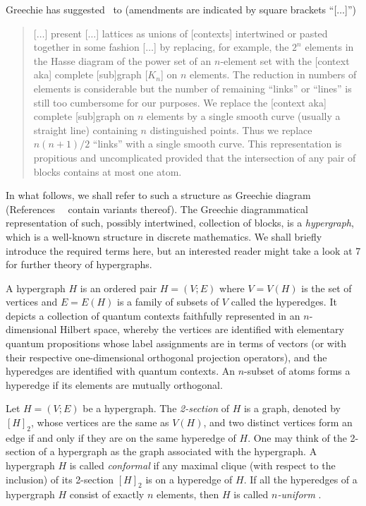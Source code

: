 \documentclass[%
12pt,
prereprint,
showpacs,
showkeys,
preprintnumbers,
amsmath,amssymb,
aps,
pra,
longbibliography,
notitlepage
]{revtex4-1}
\theoremstyle{definition}
\begin{document}
        Greechie has suggested~\cite{greechie:71} to (amendments are indicated by square brackets ``[$\ldots$]'')
        \begin{quote}
                [$\ldots$]
                present [$\ldots$] lattices as unions of [contexts]
                intertwined or pasted together in some fashion
                [$\ldots$]
                by replacing, for example, the $2^n$ elements in the Hasse diagram of the power set
                of an $n$-element set with the [context aka] complete [sub]graph [$K_n$] on $n$ elements.
                The reduction in numbers of elements is considerable but the number of remaining ``links''
                or ``lines'' is still too cumbersome for our purposes.
                We replace the [context aka] complete [sub]graph on $n$ elements by a single smooth curve (usually a straight line)
                containing $n$ distinguished points. Thus we replace $n(n + 1)/2$ ``links'' with a single smooth curve.
                This representation is propitious and uncomplicated provided that
                the intersection of any pair of blocks contains at most one atom.
        \end{quote}

        In what follows, we shall refer to such a structure as {Greechie diagram}~\cite{kalmbach-83} (References~~\cite{Greechie1968,svozil-tkadlec,Mckay2000,Pavicic-2005,Bretto-MR3077516,2018-minimalYIYS}
        contain variants thereof). The Greechie diagrammatical representation of such, possibly intertwined, collection of blocks, is a {\em hypergraph}, which is a well-known structure in discrete mathematics. We shall briefly introduce the required terms here, but an interested reader might take a look at
7
 \cite{Bretto-MR3077516} for further theory of hypergraphs.

        A hypergraph  $H$  is an ordered pair $H=(V ;E)$ where $V=V(H)$ is the set of vertices and $E=E(H)$ is a family of subsets of $V$ called the hyperedges.
        It depicts a collection of quantum contexts faithfully represented in an $n$-dimensional Hilbert space, whereby the vertices are identified with elementary quantum propositions whose label assignments are in terms of vectors (or with their respective one-dimensional orthogonal projection operators), and the hyperedges are identified with quantum contexts. An $n$-subset of atoms forms a hyperedge if its elements are mutually orthogonal.

        Let $H = (V;E)$ be a hypergraph. The \emph{2-section}  of $H$ is a graph, denoted by $[H]_2$, whose vertices are the same as $V(H)$, and two distinct vertices form an edge if and only if they are on the same hyperedge of $H$. One may think of the 2-section of a hypergraph as the graph associated with the hypergraph. A hypergraph $H$ is called \emph{conformal} if any maximal clique (with respect to the inclusion) of its 2-section $[H]_2$ is on a hyperedge of $H$. If all the hyperedges of a hypergraph $H$ consist of exactly $n$ elements, then $H$ is called \emph{$n$-uniform} \cite{Bretto-MR3077516}.
\end{document}
